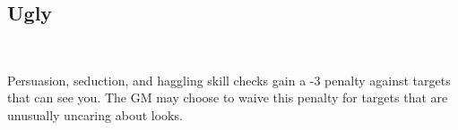 \subsection*{Ugly}\label{disadvantage:ugly}
 \\

Persuasion, seduction, and haggling skill checks gain a -3 penalty against
targets that can see you. The GM may choose to waive this penalty for targets
that are unusually uncaring about looks.

